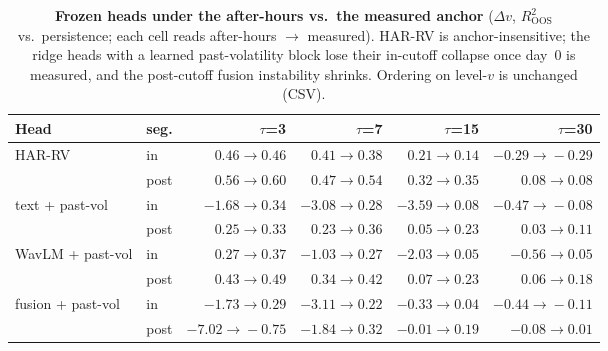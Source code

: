 \begin{table}[t]
\centering
\footnotesize
\setlength{\tabcolsep}{3.5pt}
\begin{tabular}{llrrrr}
\toprule
Head & seg. & $\tau$=3 & $\tau$=7 & $\tau$=15 & $\tau$=30 \\
\midrule
\multirow{2}{*}{HAR-RV} & in & $0.46\!\to\!0.46$ & $0.41\!\to\!0.38$ & $0.21\!\to\!0.14$ & $-0.29\!\to\!-0.29$ \\
 & post & $0.56\!\to\!0.60$ & $0.47\!\to\!0.54$ & $0.32\!\to\!0.35$ & $0.08\!\to\!0.08$ \\
\multirow{2}{*}{text + past-vol} & in & $-1.68\!\to\!0.34$ & $-3.08\!\to\!0.28$ & $-3.59\!\to\!0.08$ & $-0.47\!\to\!-0.08$ \\
 & post & $0.25\!\to\!0.33$ & $0.23\!\to\!0.36$ & $0.05\!\to\!0.23$ & $0.03\!\to\!0.11$ \\
\multirow{2}{*}{WavLM + past-vol} & in & $0.27\!\to\!0.37$ & $-1.03\!\to\!0.27$ & $-2.03\!\to\!0.05$ & $-0.56\!\to\!0.05$ \\
 & post & $0.43\!\to\!0.49$ & $0.34\!\to\!0.42$ & $0.07\!\to\!0.23$ & $0.06\!\to\!0.18$ \\
\multirow{2}{*}{fusion + past-vol} & in & $-1.73\!\to\!0.29$ & $-3.11\!\to\!0.22$ & $-0.33\!\to\!0.04$ & $-0.44\!\to\!-0.11$ \\
 & post & $-7.02\!\to\!-0.75$ & $-1.84\!\to\!0.32$ & $-0.01\!\to\!0.19$ & $-0.08\!\to\!0.01$ \\
\bottomrule
\end{tabular}
\caption{\textbf{Frozen heads under the after-hours vs.\ the measured anchor}
($\Delta v$, $R^2_{\mathrm{OOS}}$ vs.\ persistence; each cell reads after-hours
$\to$ measured). HAR-RV is anchor-insensitive; the ridge heads with a learned
past-volatility block lose their in-cutoff collapse once day~0 is measured, and the
post-cutoff fusion instability shrinks. Ordering on level-$v$ is unchanged (CSV).}
\label{tab:lookahead-measured}
\end{table}
